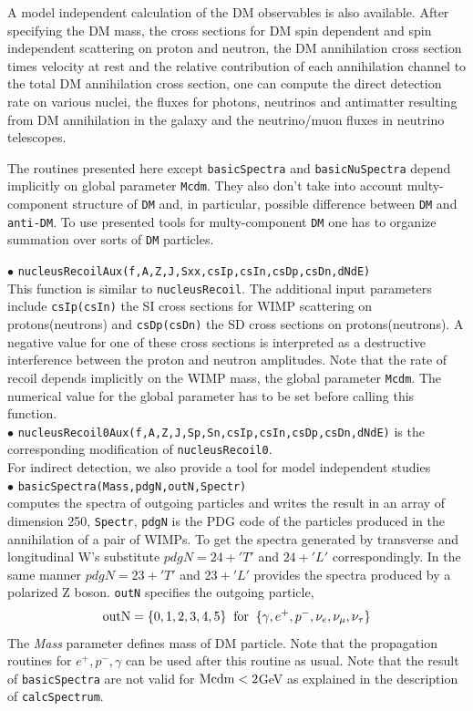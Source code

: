 \documentclass[12pt,a4paper]{article}
\begin{document}
A model independent calculation of the DM observables is also available.
After specifying the DM mass, the cross sections for DM  spin dependent and  spin independent scattering on proton and neutron, the DM annihilation cross section times velocity at rest and the relative contribution of  each annihilation channel to the total DM annihilation cross section, one can compute the direct detection rate on   various nuclei, the fluxes for photons, neutrinos and antimatter resulting from DM annihilation in the galaxy and the neutrino/muon fluxes in neutrino telescopes.  

The routines presented here except {\tt basicSpectra} and {\tt basicNuSpectra}  
depend implicitly on  global parameter {\tt Mcdm}. They also don't take
into account multy-component structure of {\tt DM} and, in particular, possible   
difference between {\tt DM} and {\tt anti-DM}. To use  presented tools
for multy-component {\tt DM} one has to organize summation over sorts of {\tt DM} particles.
  
  
   
\noindent
$\bullet$ \verb|nucleusRecoilAux(f,A,Z,J,Sxx,csIp,csIn,csDp,csDn,dNdE)|\\
This function is similar to \verb|nucleusRecoil|. 
The additional input parameters include \verb|csIp(csIn)| the SI cross 
sections for WIMP scattering on protons(neutrons) and
\verb|csDp(csDn)| the SD cross sections on protons(neutrons). 
A negative value for one of these cross sections is interpreted as a destructive 
interference between the
proton and neutron amplitudes. Note that the rate of recoil  depends 
implicitly on the WIMP mass, the  global parameter \verb|Mcdm|.
 The numerical value for the global parameter has to be
set before calling this function.\\
\noindent
$\bullet$ \verb|nucleusRecoil0Aux(f,A,Z,J,Sp,Sn,csIp,csIn,csDp,csDn,dNdE)|
is the corresponding modification of \verb|nucleusRecoil0|.\\

For indirect detection, we also provide a tool for model independent studies\\ 
\noindent
$\bullet$ \verb|basicSpectra(Mass,pdgN,outN,Spectr)|\\
computes the spectra of outgoing particles and writes the result in an array of dimension 250, \verb|Spectr|,
\verb|pdgN| is the PDG code of the particles produced in the annihilation of a pair of 
WIMPs. To get the spectra generated by transverse and longitudinal W's substitute 
$ pdgN=24+'T'$ and $24+'L'$ correspondingly. In the same manner $pdgN=23+'T'$ and
$23+'L'$  provides the spectra produced by a polarized Z boson.
 \verb|outN|  specifies the outgoing particle,
$$ {\rm outN} = \{0,1,2,3,4,5\} \;\; {\rm for}\;\; \{\gamma,   e^+,  p^-, \nu_e,
\nu_{\mu},\nu_{\tau}\} $$
The {\it Mass} parameter defines mass of DM particle.
Note that the  propagation routines for $e^+,p^-,\gamma$ can be used after 
this routine as usual. Note that the result of {\tt basicSpectra}
are not valid for ${\rm Mcdm} < 2$GeV as explained in the description of {\tt calcSpectrum}.  
\end{document}
